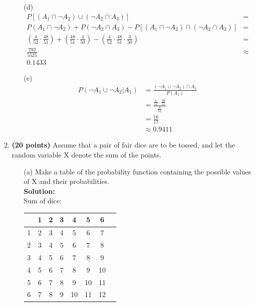 \documentclass[a4paper]{article}
\begin{document}
\begin{enumerate}
\begin{enumerate}
\newpage	
	
	
	\item[(d)] 
\begin{align*}
P[(A_1 \cap \neg A_2) \cup (\neg A_2 \cap A_3)] &=\\P(A_1 \cap \neg A_2) + P(\neg A_2 \cap A_3) - P[(A_1 \cap \neg A_2) \cap (\neg A_2 \cap A_3)] &=\\(\frac{4}{52} \cdot \frac{48}{51}) + (\frac{48}{51} \cdot \frac{4}{50}) - (\frac{4}{52} \cdot \frac{48}{51} \cdot \frac{3}{50}) &=\\\frac{792}{5525} &\approx\\0.1433
\end{align*}	
	
	
	\item[(e)]
\begin{align*}
P(\neg A_1 \cup \neg A_2 | A_1) &= \frac{(\neg A_1 \cup \neg A_2) \cap A_1}{P(A_1)}\\
&= \frac{\frac{4}{52} \cdot \frac{48}{51}}{\frac{4}{52}}\\
&= \frac{16}{17}\\
&\approx 0.9411
\end{align*}	 
\end{enumerate}






\item \textbf{(20 points)} Assume that a pair of fair dice are to be tossed, and let the random variable X denote the sum of the points.\\


\begin{enumerate}
	\item[(a)] Make a table of the probability function containing the possible values of X and their probabilities.\\
	\textbf{Solution:}\\
	
Sum of dice:\\

\begin{tabular}{l*{6}{c}r}
                  & 1  & 2 & 3 & 4 & 5 & 6 \\
\hline
                 1 \vline & 2 & 3 & 4 & 5 & 6 & 7  \\
                2 \vline  & 3 & 4 & 5 & 6 & 7 & 8  \\
                3 \vline  & 4 & 5 & 6 & 7 & 8 & 9  \\
                4 \vline  & 5 & 6 & 7 & 8 & 9 & 10  \\
                5 \vline  & 6 & 7 & 8 & 9 & 10 & 11  \\
                6 \vline  & 7 & 8 & 9 & 10 & 11 & 12  \\
\end{tabular}


\end{enumerate}
\end{enumerate}
\end{document}
